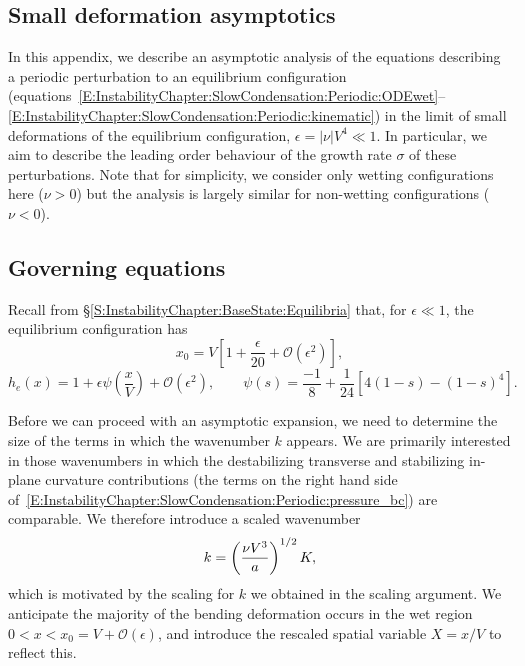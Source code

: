 \begin{subappendices}
\renewcommand{\thesection}{\Alph{section}}
\section{Small deformation asymptotics}\label{A:InstabilityChapter:SmallDeformationAsymptotics}
In this appendix, we describe an asymptotic analysis of the equations describing a periodic perturbation to an equilibrium configuration (equations~\eqref{E:InstabilityChapter:SlowCondensation:Periodic:ODEwet}--\eqref{E:InstabilityChapter:SlowCondensation:Periodic:kinematic}) in the limit of small deformations of the equilibrium configuration, $\epsilon = |\nu| V^4 \ll 1$. In particular, we aim to describe the leading order behaviour of the growth rate $\sigma$ of these perturbations. Note that for simplicity, we consider only wetting configurations here ($\nu >0$) but the analysis is largely similar for non-wetting configurations ($\nu < 0$).

\subsection{Governing equations}\label{A:S:SmallDef:GovEq}
Recall from \S\ref{S:InstabilityChapter:BaseState:Equilibria} that, for $\epsilon \ll 1$, the equilibrium configuration has
\begin{equation}\label{A:E:SmallDeformation:Equations:Asymptotic_x0_to_V}
 x_0 = V\left[1 + \frac{\epsilon}{20}  + \mathcal{O}(\epsilon^2)\right],
\end{equation}
\begin{equation}\label{A:E:SmallDeformation:Equations:Asymptotic_channel_shape}
h_e(x) = 1 + \epsilon\psi \left(\frac{x}{V}\right) + \mathcal{O}(\epsilon^2),\qquad \psi(s) = \frac{-1}{8} + \frac{1}{24}\left[4(1-s) - (1-s)^4\right].
\end{equation}

Before we can proceed with an asymptotic expansion, we need to determine the size of the terms in which the wavenumber $k$ appears. We are primarily interested in those wavenumbers in which the destabilizing transverse and stabilizing in-plane curvature contributions (the terms on the right hand side of~\eqref{E:InstabilityChapter:SlowCondensation:Periodic:pressure_bc}) are comparable. We therefore introduce a scaled wavenumber
\begin{equation}\label{E:Chapter6:SmallDeformation:RescaledProblem:Wavenumber}
k = \left(\frac{\nu V^3}{a}\right)^{1/2} K,
\end{equation}
which is motivated by the scaling for $k$ we obtained in the scaling argument. We anticipate the majority of the bending deformation occurs in the wet region $0 < x < x_0 = V + \mathcal{O}(\epsilon)$, and introduce the rescaled spatial variable $X = x/V$ to reflect this.


\end{subappendices}
